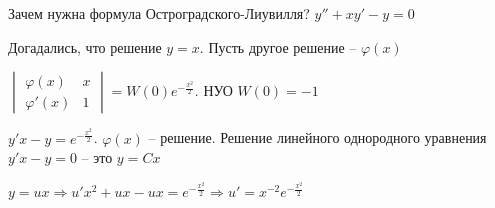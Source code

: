 \documentclass[12pt]{article}
\begin{document}
\begin{Remark}{Зачем нужна формула Остроградского-Лиувилля?}
    $y'' + xy' - y = 0$

    Догадались, что решение $y = x$. Пусть другое решение -- $\varphi(x)$

    $\begin{vmatrix}
        \varphi(x) & x \\
        \varphi'(x) & 1
    \end{vmatrix} = W(0) e^{-\frac{x^2}{2}}$. НУО $W(0) = -1$

    $y'x - y = e^{-\frac{x^2}{2}}$. $\varphi(x)$ -- решение. Решение линейного однородного уравнения $y'x - y = 0$ -- это $y = Cx$

    $y = ux \Rightarrow u'x^2 + ux - ux = e^{-\frac{x^2}{2}} \Rightarrow u' = x^{-2} e^{-\frac{x^2}{2}}$
\end{Remark}
\end{document}
